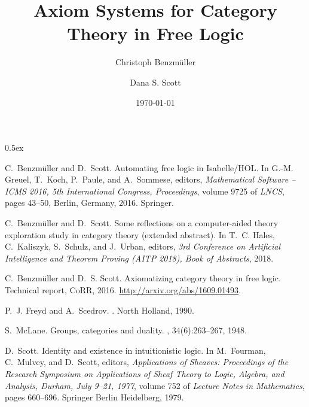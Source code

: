 \documentclass[11pt,a4paper]{article}
\begin{document}
\title{Axiom Systems for Category Theory in Free Logic}
\author[1]{Christoph Benzm\"uller}
\author[2]{Dana S. Scott}
\date{\today}                     %
\setcounter{Maxaffil}{0}
\renewcommand\Affilfont{\itshape\small}

\maketitle

\tableofcontents

\parindent 0pt\parskip 0.5ex




% 

\begin{thebibliography}{1}

C.~Benzm{\"u}ller and D.~Scott.
\newblock Automating free logic in {Isabelle/HOL}.
\newblock In G.-M. Greuel, T.~Koch, P.~Paule, and A.~Sommese, editors, {\em
  Mathematical Software -- ICMS 2016, 5th International Congress, Proceedings},
  volume 9725 of {\em LNCS}, pages 43--50, Berlin, Germany, 2016. Springer.

C.~Benzm{\"u}ller and D.~Scott.
\newblock Some reflections on a computer-aided theory exploration study in
  category theory (extended abstract).
\newblock In T.~C. Hales, C.~Kaliszyk, S.~Schulz, and J.~Urban, editors, {\em
  3rd Conference on Artificial Intelligence and Theorem Proving (AITP 2018),
  Book of Abstracts}, 2018.

C.~Benzm{\"u}ller and D.~S. Scott.
\newblock Axiomatizing category theory in free logic.
\newblock Technical report, CoRR, 2016.
\newblock \url{http://arxiv.org/abs/1609.01493}.

P.~J. Freyd and A.~Scedrov.
.
\newblock North Holland, 1990.

S.~McLane.
\newblock Groups, categories and duality.
,
  34(6):263--267, 1948.

D.~Scott.
\newblock Identity and existence in intuitionistic logic.
\newblock In M.~Fourman, C.~Mulvey, and D.~Scott, editors, {\em Applications of
  Sheaves: Proceedings of the Research Symposium on Applications of Sheaf
  Theory to Logic, Algebra, and Analysis, Durham, July 9--21, 1977}, volume 752
  of {\em Lecture Notes in Mathematics}, pages 660--696. Springer Berlin
  Heidelberg, 1979.

\end{thebibliography}
\end{document}
